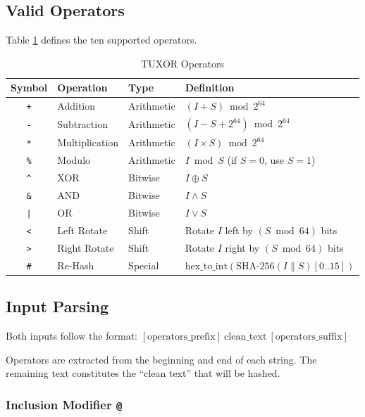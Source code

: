\documentclass[11pt,a4paper]{article}
\begin{document}
\subsection{Valid Operators}

Table \ref{tab:operators} defines the ten supported operators.

\begin{table}[h]
\centering
\caption{TUXOR Operators}
\label{tab:operators}
\begin{tabular}{@{}clll@{}}
\toprule
Symbol & Operation & Type & Definition \\
\midrule
\texttt{+} & Addition & Arithmetic & $(I + S) \bmod 2^{64}$ \\
\texttt{-} & Subtraction & Arithmetic & $(I - S + 2^{64}) \bmod 2^{64}$ \\
\texttt{*} & Multiplication & Arithmetic & $(I \times S) \bmod 2^{64}$ \\
\texttt{\%} & Modulo & Arithmetic & $I \bmod S$ (if $S=0$, use $S=1$) \\
\texttt{\^{}} & XOR & Bitwise & $I \oplus S$ \\
\texttt{\&} & AND & Bitwise & $I \wedge S$ \\
\texttt{|} & OR & Bitwise & $I \vee S$ \\
\texttt{<} & Left Rotate & Shift & Rotate $I$ left by $(S \bmod 64)$ bits \\
\texttt{>} & Right Rotate & Shift & Rotate $I$ right by $(S \bmod 64)$ bits \\
\texttt{\#} & Re-Hash & Special & $\text{hex\_to\_int}(\text{SHA-256}(I \| S)[0..15])$ \\
\bottomrule
\end{tabular}
\end{table}

\subsection{Input Parsing}

Both inputs follow the format: $[\text{operators\_prefix}]\ \text{clean\_text}\ [\text{operators\_suffix}]$

Operators are extracted from the beginning and end of each string. The remaining text constitutes the ``clean text'' that will be hashed.

\subsubsection{Inclusion Modifier \texttt{@}}
\end{document}
